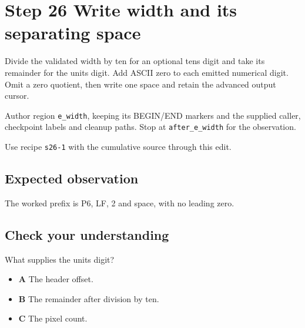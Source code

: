 \section{Step 26 Write width and its separating space}\label{ppm-s26}

Divide the validated width by ten for an optional tens digit and take its remainder for the units digit. Add ASCII zero to each emitted numerical digit. Omit a zero quotient, then write one space and retain the advanced output cursor.

Author region \texttt{e\_width}, keeping its BEGIN/END markers and the supplied caller, checkpoint labels and cleanup paths. Stop at \texttt{after\_e\_width} for the observation.

Use recipe \texttt{s26-1} with the cumulative source through this edit.

\subsection{Expected observation}
The worked prefix is P6, LF, 2 and space, with no leading zero.

\subsection{Check your understanding}
What supplies the units digit?

\begin{itemize}
  \item \textbf{A} The header offset.
  \item \textbf{B} The remainder after division by ten.
  \item \textbf{C} The pixel count.
\end{itemize}
